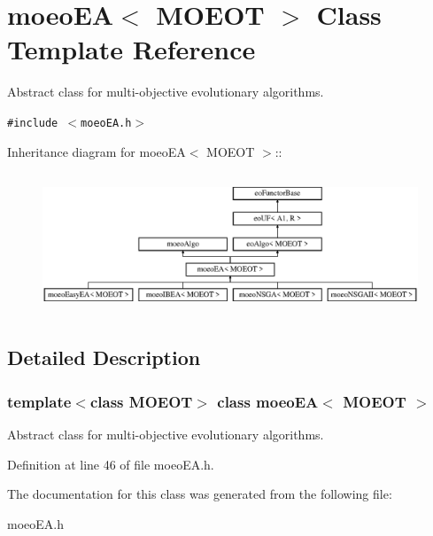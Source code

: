 \section{moeo\-EA$<$ MOEOT $>$ Class Template Reference}
\label{classmoeoEA}
Abstract class for multi-objective evolutionary algorithms.  


{\tt \#include $<$moeo\-EA.h$>$}

Inheritance diagram for moeo\-EA$<$ MOEOT $>$::\begin{figure}[H]
\begin{center}
\leavevmode
\includegraphics[height=4.24242cm]{classmoeoEA}
\end{center}
\end{figure}


\subsection{Detailed Description}
\subsubsection*{template$<$class MOEOT$>$ class moeo\-EA$<$ MOEOT $>$}

Abstract class for multi-objective evolutionary algorithms. 



Definition at line 46 of file moeo\-EA.h.

The documentation for this class was generated from the following file:\begin{CompactItemize}
\item 
moeo\-EA.h\end{CompactItemize}
